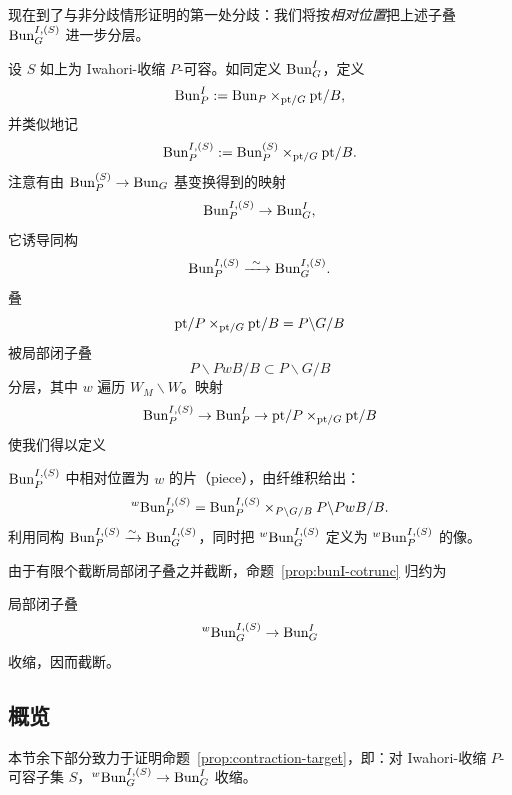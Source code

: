 现在到了与非分歧情形证明的第一处分歧：我们将按\emph{相对位置}把上述子叠
$\mathrm{Bun}^{I,(S)}_G$ 进一步分层。

设 $S$ 如上为 Iwahori-收缩 $P$-可容。如同定义 $\mathrm{Bun}^I_G$，定义
\[
\mathrm{Bun}^I_P:=\mathrm{Bun}_P\times_{\mathrm{pt}/G}\mathrm{pt}/B,
\]
并类似地记
\[
\mathrm{Bun}^{I,(S)}_P:=\mathrm{Bun}^{(S)}_P\times_{\mathrm{pt}/G}\mathrm{pt}/B.
\]
注意有由 $\mathrm{Bun}^{(S)}_P\to \mathrm{Bun}_G$ 基变换得到的映射
\[
\mathrm{Bun}^{I,(S)}_P\to \mathrm{Bun}^{I}_G,
\]
它诱导同构
\[
\Bun^{I,(S)}_P\xrightarrow{\ \sim\ }\Bun^{I,(S)}_G .
\]
叠
\[
\mathrm{pt}/P\times_{\mathrm{pt}/G}\mathrm{pt}/B=P\backslash G/B
\]
被局部闭子叠
\[
P\backslash PwB/B\subset P\backslash G/B
\]
分层，其中 $w$ 遍历 $W_M\backslash W$。映射
\[
\mathrm{Bun}^{I,(S)}_P\to \mathrm{Bun}^I_P\to \mathrm{pt}/P\times_{\mathrm{pt}/G}\mathrm{pt}/B
\]
使我们得以定义

\begin{definition}
\label{def:w-piece}
$\mathrm{Bun}^{I,(S)}_P$ 中相对位置为 $w$ 的片（piece），由纤维积给出：
\[
{}^{w}\mathrm{Bun}^{I,(S)}_P
=\mathrm{Bun}^{I,(S)}_P\times_{P\backslash G/B}P\backslash PwB/B .
\]
利用同构 $\mathrm{Bun}^{I,(S)}_P\xrightarrow{\sim}\mathrm{Bun}^{I,(S)}_G$，同时把
${}^{w}\mathrm{Bun}^{I,(S)}_G$ 定义为 ${}^{w}\mathrm{Bun}^{I,(S)}_P$ 的像。
\end{definition}

由于有限个截断局部闭子叠之并截断，命题~\ref{prop:bunI-cotrunc} 归约为

\begin{proposition}
\label{prop:contraction-target}
局部闭子叠
\[
{}^{w}\mathrm{Bun}^{I,(S)}_G\to \mathrm{Bun}^I_G
\]
收缩，因而截断。
\end{proposition}

\subsection{概览}
\label{sec:outline}

本节余下部分致力于证明命题~\ref{prop:contraction-target}，即：对 Iwahori-收缩
$P$-可容子集 $S$，${}^{w}\mathrm{Bun}^{I,(S)}_G\to \mathrm{Bun}^I_G$ 收缩。

